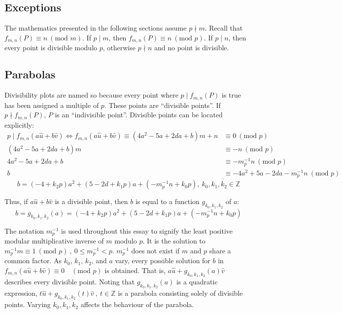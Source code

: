 \documentclass{article}
\begin{document}
\subsection{Exceptions}

The mathematics presented in the following sections assume \(p \nmid m\). Recall that \(f_{m,n}(P) \equiv n\ (\text{mod }m)\). If \(p \mid m\), then \(f_{m,n}(P) \equiv n\ (\text{mod }p)\). If \(p \mid n\), then every point is divisible modulo \(p\), otherwise \(p \nmid n\) and no point is divisible.


\subsection{Parabolas}

Divisibility plots are named so because every point where \(p \mid f_{m,n}(P)\) is true has been assigned a multiple of \(p\). These points are ``divisible points''. If \(p \nmid f_{m,n}(P)\), \(P\) is an ``indivisible point''. Divisible points can be located explicitly:
\begin{align}
	\nonumber p \mid f_{m,n}(a\hat{u}+b\hat{v}) \iff f_{m,n}(a\hat{u}+b\hat{v}) \equiv (4a^2 - 5a + 2da + b)m + n &\equiv 0\ (\text{mod } p) \\
	\nonumber (4a^2 - 5a + 2da + b)m &\equiv -n\ (\text{mod } p) \\
	\nonumber 4a^2 - 5a + 2da + b &\equiv -m^{-1}_pn\ (\text{mod } p) \\
	\nonumber b &\equiv -4a^2 + 5a - 2da - m^{-1}_pn\ (\text{mod } p)
\end{align}
\[b = (-4+k_2p)a^2 + (5-2d+k_1p)a + (-m^{-1}_pn+k_0p),\ k_0,k_1,k_2 \in \mathbb{Z}\]
	
Thus, if \(a\hat{u}+b\hat{v}\) is a divisible point, then \(b\) is equal to a function \(g_{k_0,k_1,k_2}\) of \(a\):
	\[b = g_{k_0,k_1,k_2}(a) = (-4+k_2p)a^2 + (5-2d+k_1p)a + (-m^{-1}_pn+k_0p)\]

The notation \(m^{-1}_p\) is used throughout this essay to signify the least positive modular multiplicative inverse of \(m\) modulo \(p\). It is the solution to \(m^{-1}_pm \equiv 1\ (\text{mod } p)\ ,\ 0 \leq m^{-1}_p < p\). \(m^{-1}_p\) does not exist if \(m\) and \(p\) share a common factor. As \(k_0\), \(k_1\), \(k_2\), and \(a\) vary, every possible solution for \(b\) in \(f_{m,n}(a\hat{u}+b\hat{v}) \equiv 0\quad(\text{mod } p)\) is obtained. That is, \(a\hat{u}+g_{k_0,k_1,k_2}(a)\hat{v}\) describes every divisible point. Noting that \(g_{k_0,k_1,k_2}(a)\) is a quadratic expression, \(t\hat{u}+g_{k_0,k_1,k_2}(t)\hat{v}\ ,\ t \in \mathbb{Z}\) is a parabola consisting solely of divisible points. Varying \(k_0,k_1,k_2\) affects the behaviour of the parabola.
\end{document}
